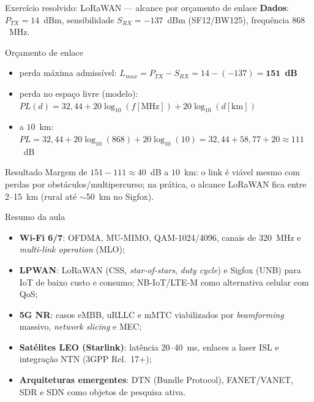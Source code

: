 \documentclass[aspectratio=169,11pt]{beamer}
\begin{document}
\begin{frame}{Exercício resolvido: LoRaWAN --- alcance por orçamento de enlace}
  \textbf{Dados}: $P_{TX}=14$~dBm, sensibilidade $S_{RX}=-137$~dBm (SF12/BW125), frequência $868$~MHz.
  \begin{block}{Orçamento de enlace}
    \begin{itemize}
      \item perda máxima admissível: $L_{max}=P_{TX}-S_{RX}=14-(-137)=\mathbf{151}$~\textbf{dB}
      \item perda no espaço livre (modelo): $PL(d)=32{,}44+20\log_{10}(f[\text{MHz}])+20\log_{10}(d[\text{km}])$
      \item a $10$~km: $PL=32{,}44+20\log_{10}(868)+20\log_{10}(10)=32{,}44+58{,}77+20\approx 111$~dB
    \end{itemize}
  \end{block}
  \pause
  \begin{exampleblock}{Resultado}
    Margem de $151-111\approx 40$~dB a $10$~km: o link é viável mesmo com perdas por obstáculos/multipercurso; na prática, o alcance LoRaWAN fica entre 2--15~km (rural até $\sim$50~km no Sigfox).
  \end{exampleblock}
\end{frame}

\begin{frame}{Resumo da aula}
  \begin{itemize}
    \item \textbf{Wi-Fi 6/7}: OFDMA, MU-MIMO, QAM-1024/4096, canais de 320~MHz e \emph{multi-link operation} (MLO);
    \item \textbf{LPWAN}: LoRaWAN (CSS, \emph{star-of-stars}, \emph{duty cycle}) e Sigfox (UNB) para IoT de baixo custo e consumo; NB-IoT/LTE-M como alternativa celular com QoS;
    \item \textbf{5G NR}: casos eMBB, uRLLC e mMTC viabilizados por \emph{beamforming} massivo, \emph{network slicing} e MEC;
    \item \textbf{Satélites LEO (Starlink)}: latência 20--40~ms, enlaces a laser ISL e integração NTN (3GPP Rel.\ 17+);
    \pause
    \item \textbf{Arquiteturas emergentes}: DTN (Bundle Protocol), FANET/VANET, SDR e SDN como objetos de pesquisa ativa.
  \end{itemize}
\end{frame}
\end{document}
